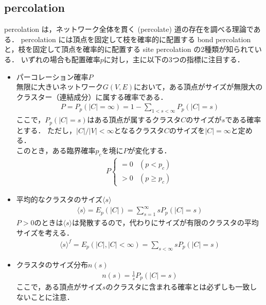 \documentclass[../main]{subfiles}
\begin{document}
\subsection{percolation}
percolation は，ネットワーク全体を貫く (percolate) 道の存在を調べる理論である．
percolation には頂点を固定して枝を確率的に配置する bond percolation と，枝を固定して頂点を確率的に配置する site percolation の2種類が知られている．
いずれの場合も配置確率$p$に対し，主に以下の3つの指標に注目する．
\begin{itemize}
    \item パーコレーション確率$P$\\
        無限に大きいネットワーク$G(V,E)$において，ある頂点がサイズが無限大のクラスター（連結成分）に属する確率である．
        \begin{align*}
            P=P_p(|C|=\infty)=1-\sum_{1<s<\infty}P_p(|C|=s)
        \end{align*} 
        ここで，$P_p(|C|=s)$はある頂点が属するクラスタ$C$のサイズが$s$である確率とする．
        ただし，$|C|/|V|<\infty$となるクラスタ$C$のサイズを$|C|=\infty$と定める．\\
        このとき，ある臨界確率$p_c$を境に$P$が変化する．
        \begin{align*}
            P
            \begin{cases}
                = 0 & (p<p_c)\\
                > 0 & (p\geq p_c)
            \end{cases}
        \end{align*}
    \item 平均的なクラスタのサイズ$\langle s \rangle$
        \begin{align*}
            \langle s\rangle =E_p(|C|)=\sum_{s=1}^\infty sP_p(|C|=s)
        \end{align*}
        $P>0$のときは$\langle s\rangle$は発散するので，代わりにサイズが有限のクラスタの平均サイズを考える．
        \begin{align*}
            \langle s\rangle^f =E_p(|C|,|C|<\infty)=\sum_{s<\infty} sP_p(|C|=s)            
        \end{align*}
    \item クラスタのサイズ分布$n(s)$
    \begin{align*}
        n(s)=\frac{1}{s}P_p(|C|=s)
    \end{align*}
    ここで，ある頂点がサイズ$s$のクラスタに含まれる確率とは必ずしも一致しないことに注意．
\end{itemize}
\end{document}
